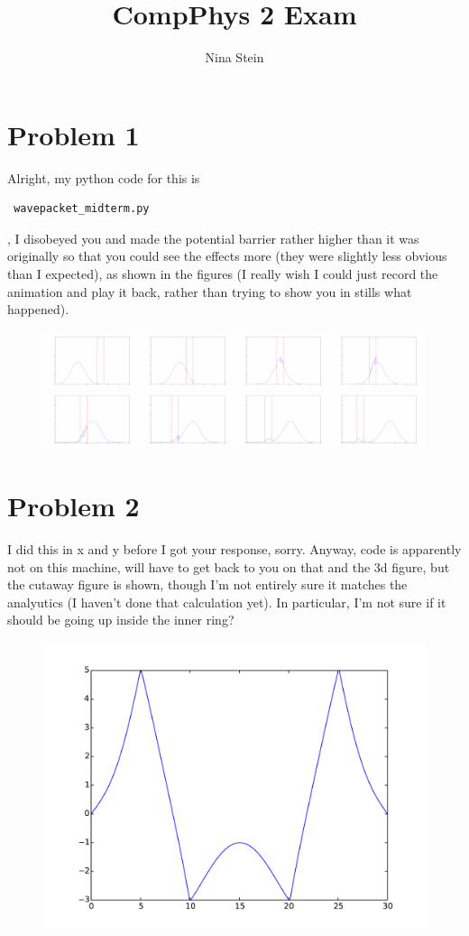 \documentclass[11pt,letterpaper]{article}
\author{Nina Stein}
\title{CompPhys 2 Exam}
\begin{document}
\maketitle

\section*{Problem 1}
 Alright, my python code for this is \begin{verbatim}
 wavepacket_midterm.py
 \end{verbatim}, I disobeyed you and made the potential barrier rather higher than it was originally so that you could see the effects more (they were slightly less obvious than I expected), as shown in the figures (I really wish I could just record the animation and play it back, rather than trying to show you in stills what happened). 
 \begin{figure}
 \includegraphics[width=0.9\linewidth]{movingbarrier.pdf}
 \end{figure}
\section*{Problem 2}
I did this in x and y before I got your response, sorry. Anyway, code is apparently not on this machine, will have to get back to you on that and the 3d figure, but the cutaway figure is shown, though I'm not entirely sure it matches the analyutics (I haven't done that calculation yet). In particular, I'm not sure if it should be going up inside the inner ring?
\begin{figure}
\includegraphics[width=0.9\linewidth]{cutaway.pdf}
\end{figure} 
\end{document}
